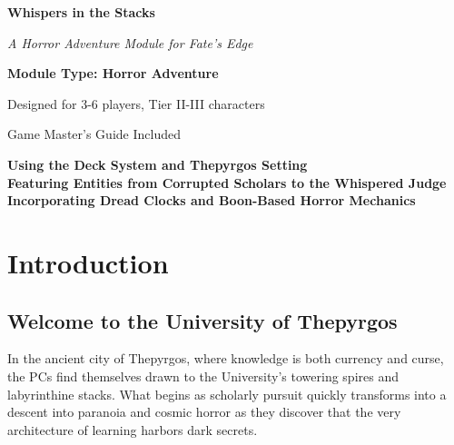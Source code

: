 \documentclass[11pt]{article}
\begin{document}
\begin{titlepage}
\centering
\vspace*{2cm}

{\Huge\bfseries\color{headercolor} Whispers in the Stacks} 

\vspace{0.5cm}

{\Large\itshape A Horror Adventure Module for Fate's Edge}

\vspace{2cm}

\vspace{2cm}

{\Large\bfseries Module Type: Horror Adventure}

\vspace{1cm}

{\large Designed for 3-6 players, Tier II-III characters}

\vspace{1cm}

{\large Game Master's Guide Included}

\vfill

{\large 
\textbf{Using the Deck System and Thepyrgos Setting} \\
\textbf{Featuring Entities from Corrupted Scholars to the Whispered Judge} \\
\textbf{Incorporating Dread Clocks and Boon-Based Horror Mechanics}
}

\end{titlepage}

\newpage

\tableofcontents

\newpage

\section{Introduction}

\subsection{Welcome to the University of Thepyrgos}

In the ancient city of Thepyrgos, where knowledge is both currency and curse, the PCs find themselves drawn to the University's towering spires and labyrinthine stacks. What begins as scholarly pursuit quickly transforms into a descent into paranoia and cosmic horror as they discover that the very architecture of learning harbors dark secrets.
\end{document}
